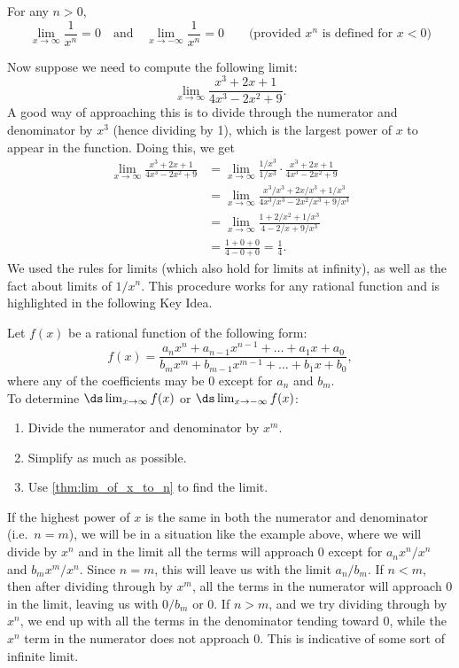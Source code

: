 \begin{theorem}\label{thm:lim_of_x_to_n}
For any $n>0$, 
\[
\lim_{x\to\infty}\frac{1}{x^n}=0
\quad\text{and}\quad
\lim_{x\to-\infty}\frac{1}{x^n}=0
\qquad\text{(provided $x^n$ is defined for $x<0$)}
\]
\end{theorem}


Now suppose we need to compute the following limit:
\[\lim_{x\rightarrow\infty}\frac{x^3+2x+1}{4x^3-2x^2+9}.\]
A good way of approaching this is to divide through the numerator and denominator by $x^3$ (hence dividing by 1), which is the largest power of $x$ to appear in the function.  Doing this, we get
\begin{align*}
\lim_{x\to\infty}\frac{x^3+2x+1}{4x^3-2x^2+9} &=
\lim_{x\to\infty}\frac{1/x^3}{1/x^3}\cdot\frac{x^3+2x+1}{4x^3-2x^2+9}\\ &=\lim_{x\to\infty}\frac{x^3/x^3+2x/x^3+1/x^3}{4x^3/x^3-2x^2/x^3+9/x^3}\\ &= \lim_{x\to\infty}\frac{1+2/x^2+1/x^3}{4-2/x+9/x^3}\\
&=\frac{1+0+0}{4-0+0}=\frac14.
\end{align*}
We used the rules for limits (which also hold for limits at infinity), as well as the fact about limits of $1/x^n$. This procedure works for any rational function and is highlighted in the following Key Idea.

\begin{keyidea}\label{key:rat_lim_at_inf}
Let $f(x)$ be a rational function of the following form:
\[
f(x)
=\frac{a_nx^n + a_{n-1}x^{n-1}+\dots + a_1x + a_0}
{b_mx^m + b_{m-1}x^{m-1} + \dots + b_1x + b_0},
\]
where any of the coefficients may be 0 except for $a_n$ and $b_m$.\\
To determine $\ds\lim_{x\to \infty}f(x)$ or $\ds\lim_{x\to-\infty}f(x)$:
\begin{enumerate}
\item Divide the numerator and denominator by $x^m$.
\item Simplify as much as possible.
\item Use \autoref{thm:lim_of_x_to_n} to find the limit.
\end{enumerate}
\end{keyidea}

If the highest power of $x$ is the same in both the numerator and denominator (i.e.\ $n=m$), we will be in a situation like the example above, where we will divide by $x^n$ and in the limit all the terms will approach 0 except for $a_nx^n/x^n$ and $b_mx^m/x^n$. Since $n=m$, this will leave us with the limit $a_n/b_m$.  If $n<m$, then after dividing through by $x^m$, all the terms in the numerator will approach 0 in the limit, leaving us with $0/b_m$ or 0.  If $n>m$, and we try dividing through by $x^n$, we end up with all the terms in the denominator tending toward 0, while the $x^n$ term in the numerator does not approach 0.  This is indicative of some sort of infinite limit.

